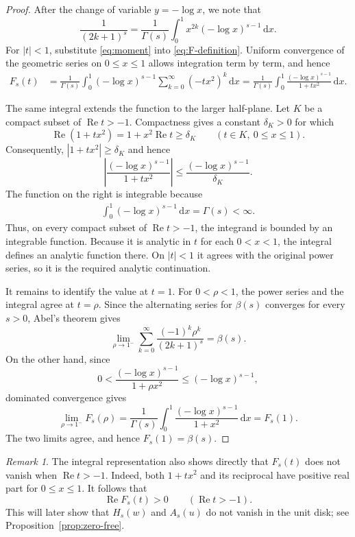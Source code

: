 \documentclass[11pt,reqno]{amsart}
\numberwithin{equation}{section}
\theoremstyle{definition}
\theoremstyle{remark}
\newtheorem{remark}[theorem]{Remark}
\DeclareMathOperator{\RePart}{Re}
\newcommand{\dd}{\,\mathrm{d}}
\begin{document}
\begin{proof}
After the change of variable \(y=-\log x\), we note that
\begin{equation}\label{eq:moment}
 \frac1{(2k+1)^s}
 =
 \frac1{\Gamma(s)}
 \int_0^1x^{2k}(-\log x)^{s-1}\dd x.
\end{equation}
For \(|t|<1\), substitute \eqref{eq:moment} into
\eqref{eq:F-definition}.  Uniform convergence of the geometric series
on \(0\leq x\leq1\) allows integration term by term, and hence
\[
 \begin{aligned}
 F_s(t)
 &=
 \frac1{\Gamma(s)}
 \int_0^1
 (-\log x)^{s-1}
 \sum_{k=0}^{\infty}(-tx^2)^k\dd x=
 \frac1{\Gamma(s)}
 \int_0^1
 \frac{(-\log x)^{s-1}}{1+tx^2}\dd x.
 \end{aligned}
\]

The same integral extends the function to the larger half-plane.  Let
\(K\) be a compact subset of \(\RePart t>-1\).  Compactness gives a
constant \(\delta_K>0\) for which
\[
 \RePart(1+tx^2)
 =1+x^2\RePart t
 \geq\delta_K
 \qquad
 (t\in K,\ 0\leq x\leq1).
\]
Consequently,
\(
 |1+tx^2|\geq\delta_K
\)
and hence
\[
 \left|
 \frac{(-\log x)^{s-1}}{1+tx^2}
 \right|
 \leq
 \frac{(-\log x)^{s-1}}{\delta_K}.
\]
The function on the right is integrable because
\begin{align}\label{eq-gamma}
    \int_0^1(-\log x)^{s-1}\dd x=\Gamma(s)<\infty.
\end{align}
Thus, on every compact subset of \(\RePart t>-1\), the integrand is
bounded by an integrable function.  Because it is analytic in \(t\) for
each \(0<x<1\), the integral defines an analytic function there.  On
\(|t|<1\) it agrees with the original power series, so it is the
required analytic continuation.

It remains to identify the value at \(t=1\).  For \(0<\rho<1\), the
power series and the integral agree at \(t=\rho\).  Since the
alternating series for \(\beta(s)\) converges for every \(s>0\),
Abel's theorem gives
\[
 \lim_{\rho\to1^-}
 \sum_{k=0}^{\infty}
 \frac{(-1)^k\rho^k}{(2k+1)^s}
 =
 \beta(s).
\]
On the other hand, since
\[
 0<
 \frac{(-\log x)^{s-1}}{1+\rho x^2}
 \leq
 (-\log x)^{s-1},
\]
dominated convergence gives
\[
 \lim_{\rho\to1^-}F_s(\rho)
 =
 \frac1{\Gamma(s)}
 \int_0^1
 \frac{(-\log x)^{s-1}}{1+x^2}\dd x
 =
 F_s(1).
\]
The two limits agree, and hence \(F_s(1)=\beta(s)\).
\end{proof}
\begin{remark}\label{rem:positive-real-part}
The integral representation also shows directly that \(F_s(t)\) does not
vanish when \(\RePart t>-1\).  Indeed, both \(1+tx^2\) and its
reciprocal have positive real part for \(0\leq x\leq1\).  It follows that
\begin{equation}\label{eq:F-positive-real}
 \RePart F_s(t)>0\qquad(\RePart t>-1).
\end{equation}
This will later show that \(H_s(w)\) and \(A_s(u)\) do not vanish in
the unit disk; see Proposition~\ref{prop:zero-free}.
\end{remark}
\end{document}
